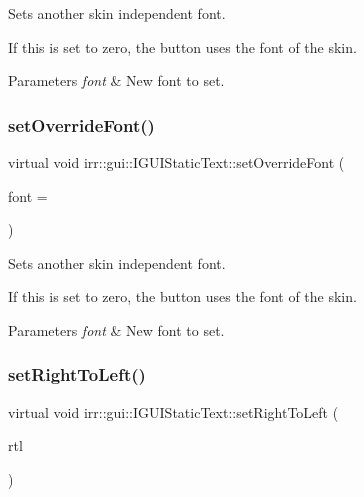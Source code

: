 Sets another skin independent font. 

If this is set to zero, the button uses the font of the skin. 
\begin{DoxyParams}{Parameters}
{\em font} & New font to set. \\
\hline
\end{DoxyParams}
\mbox{\label{classirr_1_1gui_1_1IGUIStaticText_ae3f65780d10979eb323ee7310cff7396}} 
\subsubsection{\texorpdfstring{set\+Override\+Font()}{setOverrideFont()}\hspace{0.1cm}{\footnotesize\ttfamily [2/2]}}
{\footnotesize\ttfamily virtual void irr\+::gui\+::\+I\+G\+U\+I\+Static\+Text\+::set\+Override\+Font (\begin{DoxyParamCaption}\item[{\hyperlink{classirr_1_1gui_1_1IGUIFont}{I\+G\+U\+I\+Font} $\ast$}]{font = {} }\end{DoxyParamCaption})\hspace{0.3cm}{\ttfamily [pure virtual]}}



Sets another skin independent font. 

If this is set to zero, the button uses the font of the skin. 
\begin{DoxyParams}{Parameters}
{\em font} & New font to set. \\
\hline
\end{DoxyParams}
\mbox{\label{classirr_1_1gui_1_1IGUIStaticText_a43cee247cf34faa30851f4e8c10b2367}} 
\subsubsection{\texorpdfstring{set\+Right\+To\+Left()}{setRightToLeft()}\hspace{0.1cm}{\footnotesize\ttfamily [1/2]}}
{\footnotesize\ttfamily virtual void irr\+::gui\+::\+I\+G\+U\+I\+Static\+Text\+::set\+Right\+To\+Left (\begin{DoxyParamCaption}\item[{bool}]{rtl }\end{DoxyParamCaption})\hspace{0.3cm}{\ttfamily [pure virtual]}}



